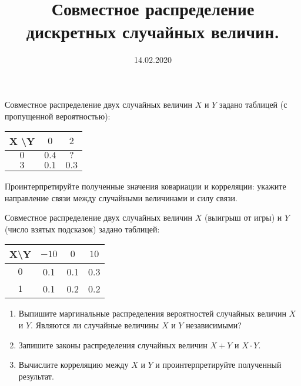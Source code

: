 \documentclass[a4paper, 12pt]{article}
\title{Совместное распределение дискретных случайных величин.}
\date{14.02.2020}
\newcommand{\E}{$\text{E}$}
\newcommand{\D}{$\text{D}$}
\newcommand{\Cov}{$\text{Cov}$}
\newcommand{\Corr}{$\text{Corr}$}
\begin{document}
\begin{problem}
Совместное распределение двух случайных величин $X$ и $Y$ 
задано таблицей (с пропущенной вероятностью):
\begin{table}[ht!]
\centering
\begin{tabular}{|c|c|c|}
\hline
X \textbackslash Y & $0$  & $2$   \\ \hline
$0$                 & $0.4$ & $?$  \\ \hline
$3$                  & $0.1$ & $0.3$  \\ \hline
\end{tabular}
\end{table}

Проинтерпретируйте полученные значения ковариации и 
корреляции: укажите направление связи между 
случайными величинами и силу связи.
\end{problem}

\begin{problem}
Совместное распределение двух случайных величин 
$X$ (выигрыш от игры) и $Y$ (число взятых подсказок) задано таблицей:
\begin{table}[ht!]
\centering
\begin{tabular}{|c|c|c|c|}
\hline
X\textbackslash Y & $-10$  & $0$  &  $10$  \\ \hline
$0$                & 0.1 & 0.1  & 0.3  \\ \hline
$1$                & 0.1 & 0.2 & 0.2   \\ \hline
\end{tabular}
\end{table}

\begin{enumerate}
\item Выпишите маргинальные распределения вероятностей 
случайных величин $X$ и $Y$. Являются ли случайные 
величины $X$ и $Y$ независимыми?
\item Запишите законы распределения случайных 
величин $X+Y$ и $X\cdot Y$.
\item Вычислите корреляцию между $X$ и $Y$ и 
проинтерпретируйте полученный результат.
\end{enumerate}
\end{problem}
\end{document}
